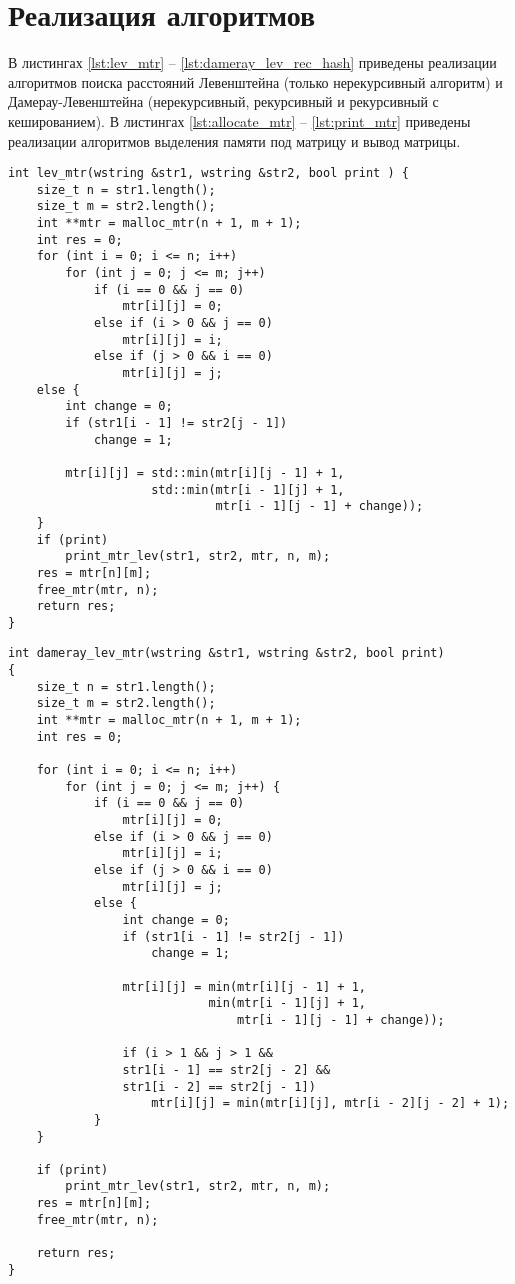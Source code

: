 \section{Реализация алгоритмов}

В листингах \ref{lst:lev_mtr} -- \ref{lst:dameray_lev_rec_hash} приведены реализации алгоритмов поиска расстояний Левенштейна (только нерекурсивный алгоритм) и Дамерау-Левенштейна (нерекурсивный, рекурсивный и рекурсивный с кешированием).
В листингах \ref{lst:allocate_mtr} -- \ref{lst:print_mtr} приведены реализации алгоритмов выделения памяти под матрицу и вывод матрицы.

\clearpage

\begin{lstlisting}[label=lst:lev_mtr,caption=Функция нахождения расстояния Левенштейна с использованием матрицы]
int lev_mtr(wstring &str1, wstring &str2, bool print ) {
	size_t n = str1.length();
	size_t m = str2.length();
	int **mtr = malloc_mtr(n + 1, m + 1);
	int res = 0;
	for (int i = 0; i <= n; i++)
		for (int j = 0; j <= m; j++)
			if (i == 0 && j == 0)
				mtr[i][j] = 0;
			else if (i > 0 && j == 0)
				mtr[i][j] = i;
			else if (j > 0 && i == 0)
				mtr[i][j] = j;
	else {
		int change = 0;
		if (str1[i - 1] != str2[j - 1])
			change = 1;
		
		mtr[i][j] = std::min(mtr[i][j - 1] + 1,
					std::min(mtr[i - 1][j] + 1,
							 mtr[i - 1][j - 1] + change));
	}
	if (print)
		print_mtr_lev(str1, str2, mtr, n, m);
	res = mtr[n][m];
	free_mtr(mtr, n);
	return res;
}
\end{lstlisting}

\clearpage

\begin{lstlisting}[label=lst:dameray_lev_rec,caption=Функция нахождения расстояния Дамерау-Левенштейна с использованием матрицы]
int dameray_lev_mtr(wstring &str1, wstring &str2, bool print)
{
	size_t n = str1.length();
	size_t m = str2.length();
	int **mtr = malloc_mtr(n + 1, m + 1);
	int res = 0;
	
	for (int i = 0; i <= n; i++)
		for (int j = 0; j <= m; j++) {
			if (i == 0 && j == 0)
				mtr[i][j] = 0;
			else if (i > 0 && j == 0)
				mtr[i][j] = i;
			else if (j > 0 && i == 0)
				mtr[i][j] = j;
			else {
				int change = 0;
				if (str1[i - 1] != str2[j - 1])
					change = 1;
				
				mtr[i][j] = min(mtr[i][j - 1] + 1,
							min(mtr[i - 1][j] + 1,
								mtr[i - 1][j - 1] + change));
				
				if (i > 1 && j > 1 &&
				str1[i - 1] == str2[j - 2] &&
				str1[i - 2] == str2[j - 1])
					mtr[i][j] = min(mtr[i][j], mtr[i - 2][j - 2] + 1);
			}
	}
	
	if (print)
		print_mtr_lev(str1, str2, mtr, n, m);
	res = mtr[n][m];
	free_mtr(mtr, n);
	
	return res;
}
\end{lstlisting}

